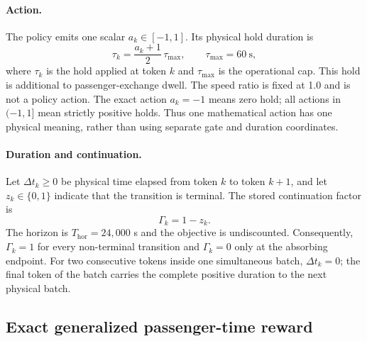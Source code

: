 \paragraph{Action.}
The policy emits one scalar $a_k\in[-1,1]$. Its physical hold duration is
\begin{equation}
\tau_k=\frac{a_k+1}{2}\,\tau_{\max},
\qquad \tau_{\max}=60\ \mathrm{s},
\label{eq:v7_action}
\end{equation}
where $\tau_k$ is the hold applied at token $k$ and $\tau_{\max}$ is the
operational cap. This hold is additional to passenger-exchange dwell.
The speed ratio is fixed at 1.0 and is not a policy action.
The exact action $a_k=-1$ means zero hold; all actions in
$(-1,1]$ mean strictly positive holds. Thus one mathematical action has one
physical meaning, rather than using separate gate and duration coordinates.

\paragraph{Duration and continuation.}
Let $\Delta t_k\geq0$ be physical time elapsed from token $k$ to token $k+1$,
and let $z_k\in\{0,1\}$ indicate that the transition is terminal. The stored
continuation factor is
\begin{equation}
\Gamma_k=1-z_k.
\label{eq:v7_discount}
\end{equation}
The horizon is $T_{\mathrm{hor}}=24{,}000$ s and the objective is
undiscounted. Consequently, $\Gamma_k=1$ for every non-terminal transition and
$\Gamma_k=0$ only at the absorbing endpoint. For two consecutive tokens inside
one simultaneous batch, $\Delta t_k=0$; the final token of the batch carries
the complete positive duration to the next physical batch.

\subsection{Exact generalized passenger-time reward}
\label{sec:problem:reward}

